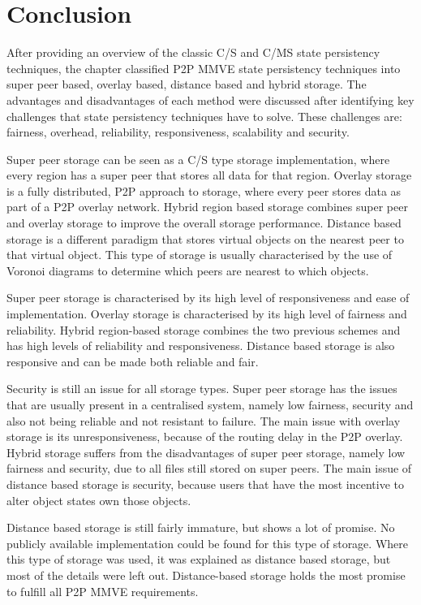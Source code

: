 \section{Conclusion}

After providing an overview of the classic C/S and C/MS state persistency techniques, the chapter classified P2P MMVE state persistency techniques into super peer based, overlay based, distance based and hybrid storage. The advantages and disadvantages of each method were discussed after identifying key challenges that state persistency techniques have to solve. These challenges are: fairness, overhead, reliability, responsiveness, scalability and security.

Super peer storage can be seen as a C/S type storage implementation, where every region has a super peer that stores all data for that region. Overlay storage is a fully distributed, P2P approach to storage, where every peer stores data as part of a P2P overlay network. Hybrid region based storage combines super peer and overlay storage to improve the overall storage performance. Distance based storage is a different paradigm that stores virtual objects on the nearest peer to that virtual object. This type of storage is usually characterised by the use of Voronoi diagrams to
determine which peers are nearest to which objects.

Super peer storage is characterised by its high level of responsiveness and ease of implementation. Overlay storage is characterised by its high level of fairness and reliability. Hybrid region-based storage combines the two previous schemes and has high levels of reliability and responsiveness. Distance based storage is also responsive and can be made both reliable and fair.

Security is still an issue for all storage types. Super peer storage has the issues that are usually present in a centralised system, namely low fairness, security and also not being reliable and not resistant to failure. The main issue with overlay storage is its unresponsiveness, because of the routing delay in the P2P overlay. Hybrid storage suffers from the disadvantages of super peer storage, namely low fairness and security, due to all files still stored on super peers. The main issue of distance based storage is security, because users that have the most incentive to alter object states own those objects.

Distance based storage is still fairly immature, but shows a lot of promise. No publicly available implementation could be found for this type of storage. Where this type of storage was used, it was explained as distance based storage, but most of the details were left out. Distance-based storage holds the most promise to fulfill all P2P MMVE requirements.

